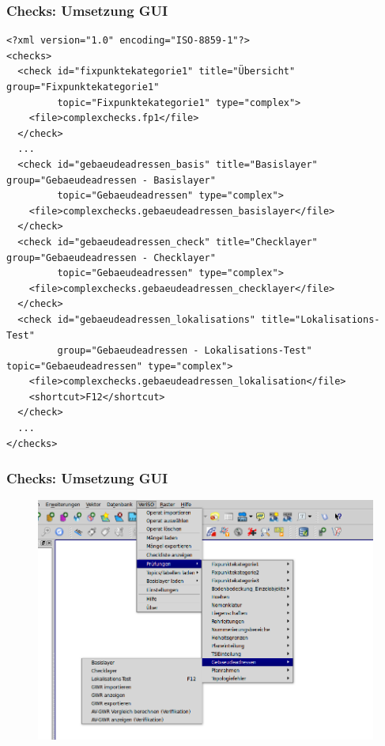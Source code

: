 \documentclass{beamer}
\begin{document}
\begin{frame}[fragile]
  \frametitle{Checks: Umsetzung GUI}
  \begin{tiny}
  \begin{verbatim}
<?xml version="1.0" encoding="ISO-8859-1"?>
<checks>
  <check id="fixpunktekategorie1" title="Übersicht" group="Fixpunktekategorie1" 
         topic="Fixpunktekategorie1" type="complex">
    <file>complexchecks.fp1</file>
  </check>
  ...  
  <check id="gebaeudeadressen_basis" title="Basislayer" group="Gebaeudeadressen - Basislayer" 
         topic="Gebaeudeadressen" type="complex">
    <file>complexchecks.gebaeudeadressen_basislayer</file>
  </check>   
  <check id="gebaeudeadressen_check" title="Checklayer" group="Gebaeudeadressen - Checklayer" 
         topic="Gebaeudeadressen" type="complex">
    <file>complexchecks.gebaeudeadressen_checklayer</file>
  </check>    
  <check id="gebaeudeadressen_lokalisations" title="Lokalisations-Test" 
         group="Gebaeudeadressen - Lokalisations-Test" topic="Gebaeudeadressen" type="complex">
    <file>complexchecks.gebaeudeadressen_lokalisation</file>
    <shortcut>F12</shortcut>
  </check>           
  ...
</checks>   
  \end{verbatim}
  \end{tiny}
\end{frame}

\begin{frame}
  \frametitle{Checks: Umsetzung GUI}
  \begin{figure}
    \includegraphics[scale=0.35]{bilder/veriso_checks_3.png}
  \end{figure}
\end{frame}
\end{document}
